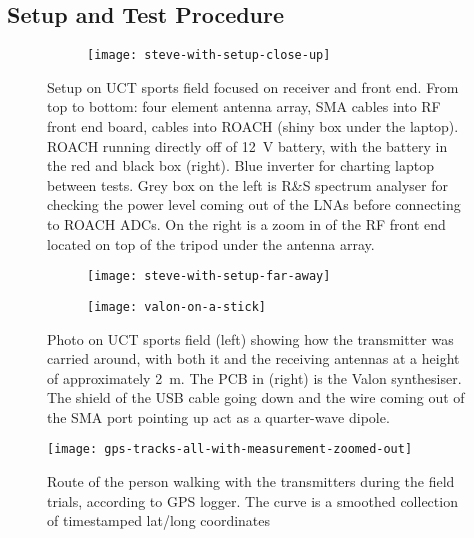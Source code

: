 \subsection{Setup and Test Procedure}

\begin{figure}
  \centering
  \begin{subfigure}{0.8\textwidth}
    \texttt{[image: steve-with-setup-close-up]}
  \end{subfigure}
  \caption{Setup on UCT sports field focused on receiver and front end. From top to bottom: four element antenna array, SMA cables into RF front end board, cables into ROACH (shiny box under the laptop). ROACH running directly off of \SI{12}{\volt} battery, with the battery in the red and black box (right). Blue inverter for charting laptop between tests. Grey box on the left is R\&S spectrum analyser for checking the power level coming out of the LNAs before connecting to ROACH ADCs.  On the right is a zoom in of the RF front end located on top of the tripod under the antenna array.}
  \label{fig:field-trials:setup-closeup}
\end{figure}

\begin{figure}
  \centering
  \begin{subfigure}[b]{0.70\textwidth}
    \centering
    \texttt{[image: steve-with-setup-far-away]}
  \end{subfigure}
  \begin{subfigure}[b]{0.24\textwidth}
    \centering
    \texttt{[image: valon-on-a-stick]}
  \end{subfigure}
  \caption{Photo on UCT sports field (left) showing how the transmitter was carried around, with both it and the receiving antennas at a height of approximately \SI{2}{\meter}. The PCB in (right) is the Valon synthesiser. The shield of the USB cable going down and the wire coming out of the SMA port pointing up act as a quarter-wave dipole.}
  \label{fig:field-trials-transmitter-on-stick}
\end{figure}

\begin{figure}
  \centering
  \texttt{[image: gps-tracks-all-with-measurement-zoomed-out]}
  \caption{Route of the person walking with the transmitters during the field trials, according to GPS logger. The curve is a smoothed collection of timestamped lat/long coordinates}
  \label{fig:field-trails:gps-tracks-all}
\end{figure}

